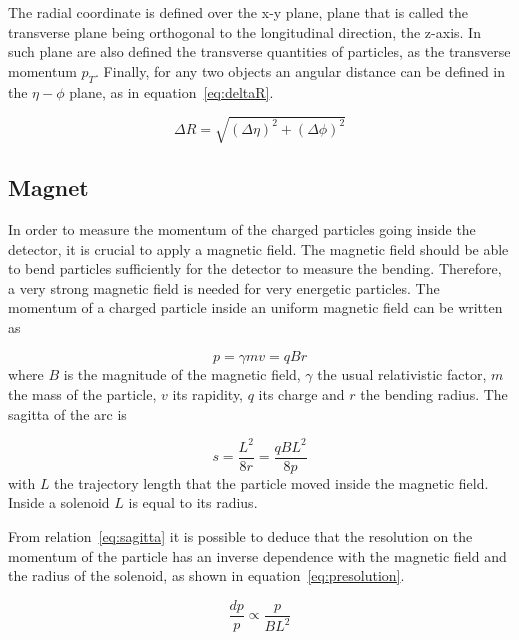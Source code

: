 The radial coordinate is defined over the x-y plane, plane that is called the transverse plane being orthogonal to the longitudinal direction, the z-axis. In such plane are also defined the transverse quantities of particles, as the transverse momentum $p_{T}$. Finally, for any two objects an angular distance can be defined in the $\eta-\phi$ plane, as in equation~\ref{eq:deltaR}.

\begin{equation}
  \label{eq:deltaR}
  \Delta R=\sqrt{(\Delta\eta)^{2}+(\Delta\phi)^{2}}
\end{equation}

\subsection{Magnet}
\label{sec:magnet}

In order to measure the momentum of the charged particles going inside the detector, it is crucial to apply a magnetic field. The magnetic field should be able to bend particles sufficiently for the detector to measure the bending. Therefore, a very strong magnetic field is needed for very energetic particles. The momentum of a charged particle inside an uniform magnetic field can be written as

\begin{equation}
  \label{eq:momB}
  p=\gamma m v=qBr
\end{equation} where $B$ is the magnitude of the magnetic field, $\gamma$ the usual relativistic factor, $m$ the mass of the particle, $v$ its rapidity, $q$ its charge and $r$ the bending radius. The sagitta of the arc is

\begin{equation}
  \label{eq:sagitta}
  s=\frac{L^{2}}{8r}=\frac{qBL^{2}}{8p}
\end{equation} with $L$ the trajectory length that the particle moved inside the magnetic field. Inside a solenoid $L$ is equal to its radius. 

From relation~\ref{eq:sagitta} it is possible to deduce that the resolution on the momentum of the particle has an inverse dependence with the magnetic field and the radius of the solenoid, as shown in equation~\ref{eq:presolution}. %

\begin{equation}
  \label{eq:presolution}
  \frac{dp}{p}\propto \frac{p}{BL^{2}}
\end{equation}


